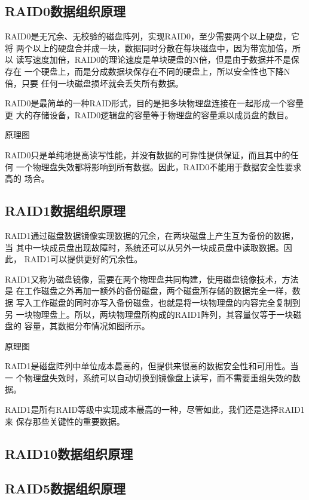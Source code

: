 \subsection{RAID0数据组织原理}

RAID0是无冗余、无校验的磁盘阵列，实现RAID0，至少需要两个以上硬盘，它将
两个以上的硬盘合并成一块，数据同时分散在每块磁盘中，因为带宽加倍，所以
读写速度加倍，RAID0的理论速度是单块硬盘的N倍，但是由于数据并不是保存在
一个硬盘上，而是分成数据块保存在不同的硬盘上，所以安全性也下降N倍，只要
任何一块磁盘损坏就会丢失所有数据。

RAID0是最简单的一种RAID形式，目的是把多块物理盘连接在一起形成一个容量更
大的存储设备，RAID0逻辑盘的容量等于物理盘的容量乘以成员盘的数目。

原理图

RAID0只是单纯地提高读写性能，并没有数据的可靠性提供保证，而且其中的任何
一个物理盘失效都将影响到所有数据。因此，RAID0不能用于数据安全性要求高的
场合。
\subsection{RAID1数据组织原理}

RAID1通过磁盘数据镜像实现数据的冗余，在两块磁盘上产生互为备份的数据，当
其中一块成员盘出现故障时，系统还可以从另外一块成员盘中读取数据。因此，
RAID1可以提供更好的冗余性。

RAID1又称为磁盘镜像，需要在两个物理盘共同构建，使用磁盘镜像技术，方法是
在工作磁盘之外再加一额外的备份磁盘，两个磁盘所存储的数据完全一样，数据
写入工作磁盘的同时亦写入备份磁盘，也就是将一块物理盘的内容完全复制到另
一块物理盘上。所以，两块物理盘所构成的RAID1阵列，其容量仅等于一块磁盘的
容量，其数据分布情况如图所示。

原理图

RAID1是磁盘阵列中单位成本最高的，但提供来很高的数据安全性和可用性。当一
个物理盘失效时，系统可以自动切换到镜像盘上读写，而不需要重组失效的数据。

RAID1是所有RAID等级中实现成本最高的一种，尽管如此，我们还是选择RAID1来
保存那些关键性的重要数据。

\subsection{RAID10数据组织原理}

\subsection{RAID5数据组织原理}

